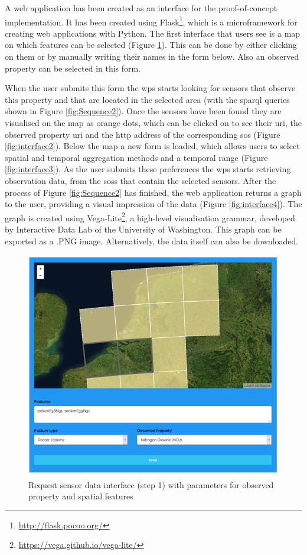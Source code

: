 A web application has been created as an interface for the proof-of-concept implementation. It has been created using Flask\footnote{\url{http://flask.pocoo.org/}}, which is a microframework for creating web applications with Python. The first interface that users see is a map on which features can be selected (Figure \ref{fig:interface1}). This can be done by either clicking on them or by manually writing their names in the form below. Also an observed property can be selected in this form.

When the user submits this form the \ac{wps} starts looking for sensors that observe this property and that are located in the selected area (with the \ac{sparql} queries shown in Figure \ref{fig:Sequence2}). Once the sensors have been found they are visualised on the map as orange dots, which can be clicked on to see their \ac{uri}, the observed property \ac{uri} and the \ac{http} address of the corresponding \ac{sos} (Figure \ref{fig:interface2}). Below the map a new form is loaded, which allows users to select spatial and temporal aggregation methods and a temporal range (Figure \ref{fig:interface3}). As the user submits these preferences the \ac{wps} starts retrieving observation data, from the \aclp{sos} that contain the selected sensors. After the process of Figure \ref{fig:Sequence2} has finished, the web application returns a graph to the user, providing a visual impression of the data (Figure \ref{fig:interface4}). The graph is created using Vega-Lite\footnote{\url{https://vega.github.io/vega-lite/}}, a high-level visualisation grammar, developed by Interactive Data Lab of the University of Washington. This graph can be exported as a .PNG image. Alternatively, the data itself can also be downloaded.   

\begin{figure}
	\centering
	\includegraphics[width=\linewidth]{figs/interface1.PNG}
	\caption{Request sensor data interface (step 1) with parameters for observed property and spatial features}
	\label{fig:interface1}
\end{figure}

